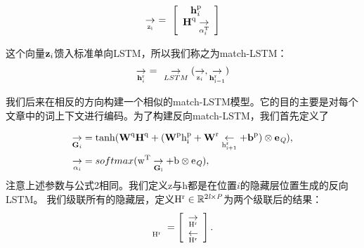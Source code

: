 \documentclass{article}
\begin{document}
\begin{CJK*}{UTF8}{gbsn}
    \begin{equation}
        \underset{\rm z_{i}}\rightarrow ~=~ 
        \left[
            \begin{array}{c}
                {\rm {\textbf h}_{\emph i}^{p}} \\
                {\rm {\textbf H}^{q} \underset{\alpha_{\emph i}^{T}}\rightarrow}
            \end{array}
        \right]
    \end{equation}

    \vspace{1ex}\noindent
    这个向量${\rm \textbf z}_{i}$馈入标准单向LSTM，所以我们称之为match-LSTM：
    \begin{equation}
        \underset{\rm \textbf{h}_{\emph i}^{r}}\rightarrow ~= ~~ \underset{LSTM}\rightarrow (\underset{\textbf{\rm z}_{i}}\rightarrow , \underset{\rm{\textbf{h}_{i-1}^{r}}}\rightarrow)
    \end{equation}
    
    \vspace{1ex}\noindent
    我们后来在相反的方向构建一个相似的match-LSTM模型。它的目的主要是对每个文章中的词上下文进行编码。为了构建反向match-LSTM，我们首先定义了

    \begin{equation}
        \begin{split}
            \underset{\textbf G_{i}}\rightarrow &= \tanh(\rm {\textbf{W}^{q}\textbf{H}^{q}+(\textbf{W}^{p}h^{p}_{i}+\textbf{W}^{r}\underset{h^{r}_{i+1}}\leftarrow+\textbf{b}^{p}) \otimes \textbf{e}_{\emph Q}}), \\
            \underset{\alpha_{i}}\rightarrow &= softmax(\rm w^{T}\underset{\textbf{G}_{i}}\rightarrow + b \otimes e_{\emph Q}), \\ 
        \end{split}
    \end{equation}
    注意上述参数与公式2相同。我们定义z与h都是在位置$i$的隐藏层位置生成的反向LSTM。
    我们级联所有的隐藏层，定义$\rm H^{r} \in \mathbb{R}^{2 \emph l \times \emph P}$为两个级联后的结果：
    \begin{equation}
        \underset{\rm H^{r}} ~~=
        \left[
            \begin{array}{c}
                \rm \underset{H^{r}}\rightarrow \\
                \rm \underset{H^{r}}\leftarrow  \\ 
            \end{array}
        \right].
    \end{equation}
    

\end{CJK*}
\end{document}
